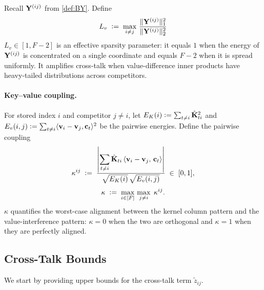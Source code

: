 \begin{definition}\label{def:Lv}
Recall $\mathbf{Y}^{(ij)}$ from \cref{def:BY}. Define
\[
L_v \;\vcentcolon=\; \max_{i \neq j}\, \frac{\|\mathbf{Y}^{(ij)}\|_1^2}{\|\mathbf{Y}^{(ij)}\|_2^2}
\]
$L_v \in [1, F-2]$ is an effective sparsity parameter: it equals $1$ when the energy of $\mathbf{Y}^{(ij)}$ is concentrated on a single coordinate and equals $F-2$ when it is spread uniformly. It amplifies cross-talk when value-difference inner products have heavy-tailed distributions across competitors.
\end{definition}

\paragraph{Key--value coupling.}

\begin{definition}\label{def:kappa}
For stored index $i$ and competitor $j \neq i$, let $E_K(i) \vcentcolon= \sum_{t \neq i} \hat{\mathbf{K}}_{ti}^2$ and $E_v(i,j) \vcentcolon= \sum_{t \neq i} \langle {\mathbf{v}}_i - {\mathbf{v}}_j, {\mathbf{c}}_t \rangle^2$ be the pairwise energies. Define the pairwise coupling
\[
\kappa^{ij}
\;\vcentcolon=\;
\frac{\displaystyle\left|\sum_{t \neq i} \hat{\mathbf{K}}_{ti}\,\langle {\mathbf{v}}_i - {\mathbf{v}}_j,\, {\mathbf{c}}_t \rangle\right|}{\sqrt{E_K(i)}\,\sqrt{E_v(i,j)}}
\;\in\; [0,1],
\]
\[
\kappa \;\vcentcolon=\; \max_{i \in [F]}\,\max_{j \neq i}\; \kappa^{ij}.
\]
$\kappa$ quantifies the worst-case alignment between the kernel column pattern and the value-interference pattern: $\kappa = 0$ when the two are orthogonal and $\kappa = 1$ when they are perfectly aligned.
\end{definition}

\subsection{Cross-Talk Bounds}
We start by providing upper bounds for the cross-talk term $\widetilde{z}_{ij}$.
